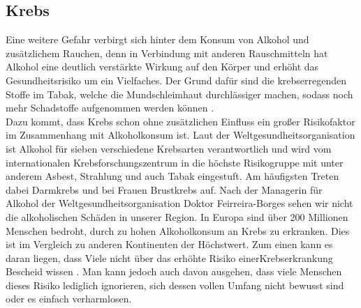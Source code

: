 \documentclass[12pt]{article}
\begin{document}
\subsection{Krebs}                                                                                                                
Eine weitere Gefahr verbirgt sich hinter dem Konsum von Alkohol und zusätzlichem Rauchen, denn in Verbindung mit anderen Rauschmitteln hat Alkohol eine deutlich verstärkte Wirkung auf den Körper und erhöht das Gesundheitsrisiko um ein Vielfaches. Der Grund dafür sind die krebserregenden Stoffe im Tabak, welche die Mundschleimhaut durchlässiger machen, sodass noch mehr Schadstoffe aufgenommen werden können \autocite{seufferlein_alkoholkonsum_2022}. \\
Dazu kommt, dass Krebs schon ohne zusätzlichen Einfluss ein großer Risikofaktor im Zusammenhang mit Alkoholkonsum ist. Laut der Weltgesundheitsorganisation ist Alkohol für sieben verschiedene Krebsarten verantwortlich und wird vom internationalen Krebsforschungszentrum in die höchste Risikogruppe mit unter anderem Asbest, Strahlung und auch Tabak eingestuft. Am häufigsten Treten dabei Darmkrebs und bei Frauen Brustkrebs auf. Nach der Managerin für Alkohol der Weltgesundheitsorganisation Doktor Feirreira-Borges sehen wir nicht die alkoholischen Schäden in unserer Region. In Europa sind über 200 Millionen Menschen bedroht, durch zu hohen Alkoholkonsum an Krebs zu erkranken. Dies ist im Vergleich zu anderen Kontinenten der Höchstwert. Zum einen kann es daran liegen, dass Viele nicht über das erhöhte Risiko einerKrebserkrankung Bescheid wissen \autocite{noauthor_beim_nodate}. Man kann jedoch auch davon ausgehen, dass viele Menschen dieses Risiko lediglich ignorieren, sich dessen vollen Umfang nicht bewusst sind oder es einfach verharmlosen. \\
\end{document}
